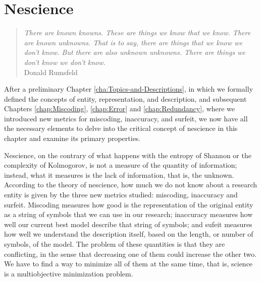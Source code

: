%
%


%
%


\chapter{Nescience}
\label{chap:Nescience}

\begin{quote}
\begin{flushright}
\emph{There are known knowns. These are things we know that we know.
There are known unknowns. That is to say, there are things that we know we don't know.
But there are also unknown unknowns. There are things we don't know we don't know.} \\
Donald Rumsfeld
\end{flushright}
\end{quote}
\bigskip

After a preliminary Chapter \ref{cha:Topics-and-Descriptions}, in which we formally defined the concepts of entity, representation, and description, and subsequent Chapters \ref{chap:Miscoding}, \ref{chap:Error} and \ref{chap:Redundancy}, where we introduced new metrics for miscoding, inaccuracy, and surfeit, we now have all the necessary elements to delve into the critical concept of nescience in this chapter and examine its primary properties.

Nescience, on the contrary of what happens with the entropy of Shannon or the complexity of Kolmogorov, is not a measure of the quantity of information; instead, what it measures is the lack of information, that is, the unknown. According to the theory of nescience, how much we do not know about a research entity is given by the three new metrics studied: miscoding, inaccuracy and surfeit. Miscoding measures how good is the representation of the original entity as a string of symbols that we can use in our research; inaccuracy measures how well our current best model describe that string of symbols; and sufeit measures how well we understand the description itself, based on the length, or number of symbols, of the model. The problem of these quantities is that they are conflicting, in the sense that decreasing one of them could increase the other two. We have to find a way to minimize all of them at the same time, that is, science is a multiobjective minimization problem.

